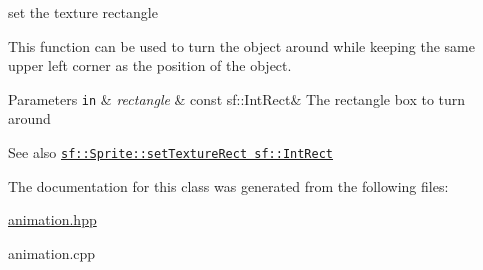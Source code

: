 set the texture rectangle 

This function can be used to turn the object around while keeping the same upper left corner as the position of the object.


\begin{DoxyParams}[1]{Parameters}
\mbox{\tt in}  & {\em rectangle} & const sf\+::\+Int\+Rect\& The rectangle box to turn around \\
\hline
\end{DoxyParams}
\begin{DoxySeeAlso}{See also}
\href{https://www.sfml-dev.org/documentation/2.0/classsf_1_1Sprite.php#a3fefec419a4e6a90c0fd54c793d82ec2 }{\tt sf\+::\+Sprite\+::set\+Texture\+Rect sf\+::\+Int\+Rect} 
\end{DoxySeeAlso}


The documentation for this class was generated from the following files\+:\begin{DoxyCompactItemize}
\item 
\hyperlink{animation_8hpp}{animation.\+hpp}\item 
animation.\+cpp\end{DoxyCompactItemize}
